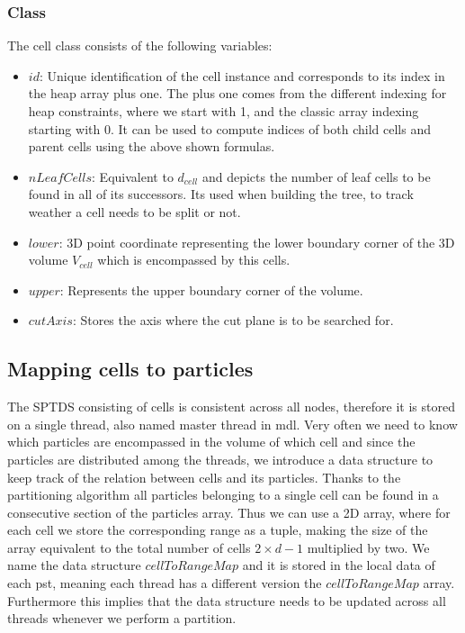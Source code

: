 \documentclass[]{article}
\begin{document}
\subsubsection{Class}
The cell class consists of the following variables:

\begin{itemize}
	\item $id$: Unique identification of the cell instance and corresponds to its index in the heap array plus one. The plus one comes from the different indexing for heap constraints, where we start with 1, and the classic array indexing starting with 0. It can be used to compute  indices of both child cells and parent cells using the above shown formulas.
	\item $nLeafCells$: Equivalent to  $d_{cell}$ and depicts the number of leaf cells to be found in all of its successors. Its used when building the tree, to track weather a cell needs to be split or not. 
	\item $lower$: 3D point coordinate representing the lower boundary corner of the 3D volume $V_{cell}$ which is encompassed by this cells.
	\item $upper$: Represents the upper boundary corner of the volume.	
	\item $cutAxis$: Stores the axis where the cut plane is to be searched for. 
\end{itemize}

\subsection{Mapping cells to particles}

The SPTDS consisting of cells is consistent across all nodes, therefore it is stored on a single thread, also named master thread in mdl. Very often we need to know which particles are encompassed in the volume of which cell and since the particles are distributed among the threads, we introduce a data structure to keep track of the relation between cells and its particles. 
Thanks to the partitioning algorithm all particles belonging to a single cell can be found in a consecutive section of the particles array. Thus we can use a 2D array, where for each cell we store the corresponding range as a tuple, making the size of the array equivalent to the total number of cells $2 \times d -1$ multiplied by two. We name the data structure $cellToRangeMap$ and it is stored in the local data of each pst, meaning each thread has a different version the $cellToRangeMap$ array. Furthermore this implies that the data structure needs to be updated across all threads whenever we perform a partition.
\end{document}
